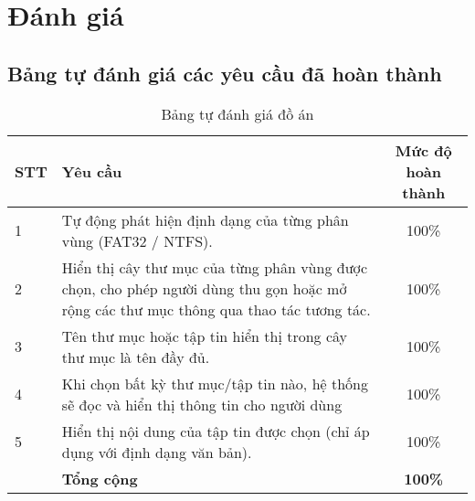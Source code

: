 \section{Đánh giá}
\subsection{Bảng tự đánh giá các yêu cầu đã hoàn thành}

\begin{center}
  \begin{table}[H]
    \centering
    \caption{Bảng tự đánh giá đồ án}
    \renewcommand{\arraystretch}{1.4}
    \begin{tabular}{|l|p{}|c|}
      \hline
      \textbf{STT} & \textbf{Yêu cầu}                                                                                                                      & \textbf{Mức độ hoàn thành} \\ \hline
      1            & Tự động phát hiện định dạng của từng phân vùng (FAT32 / NTFS).                                                                        & 100\%                      \\ \hline
      2            & Hiển thị cây thư mục của từng phân vùng được chọn, cho phép người dùng thu gọn hoặc mở rộng các thư mục thông qua thao tác tương tác.
                   & 100\%                                                                                                                                                              \\ \hline
      3            & Tên thư mục hoặc tập tin hiển thị trong cây thư mục là tên đầy đủ.
                   & 100\%                                                                                                                                                              \\ \hline
      4            & Khi chọn bất kỳ thư mục/tập tin nào, hệ thống sẽ đọc và hiển thị thông tin cho người dùng
                   & 100\%                                                                                                                                                              \\ \hline
      5            & Hiển thị nội dung của tập tin được chọn (chỉ áp dụng với định dạng văn bản).                                                          & 100\%                      \\ \hline
                   & \textbf{Tổng cộng}                                                                                                                    & \textbf{100\%}             \\ \hline
    \end{tabular}
    \label{tab:mytable}
  \end{table}
\end{center}


